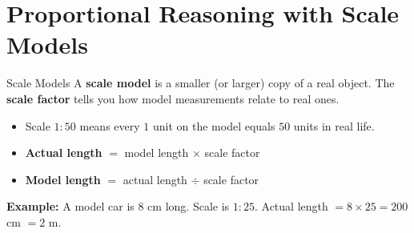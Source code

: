 \section{Proportional Reasoning with Scale Models}

\begin{quickReview}{Scale Models}
A \textbf{scale model} is a smaller (or larger) copy of a real object. The \textbf{scale factor} tells you how model measurements relate to real ones.

\begin{itemize}[leftmargin=*]
    \item Scale $1 : 50$ means every $1$ unit on the model equals $50$ units in real life.
    \item \textbf{Actual length} $=$ model length $\times$ scale factor
    \item \textbf{Model length} $=$ actual length $\div$ scale factor
\end{itemize}

\medskip
\textbf{Example:} A model car is $8$ cm long. Scale is $1 : 25$. Actual length $= 8 \times 25 = 200$ cm $= 2$ m.
\end{quickReview}

